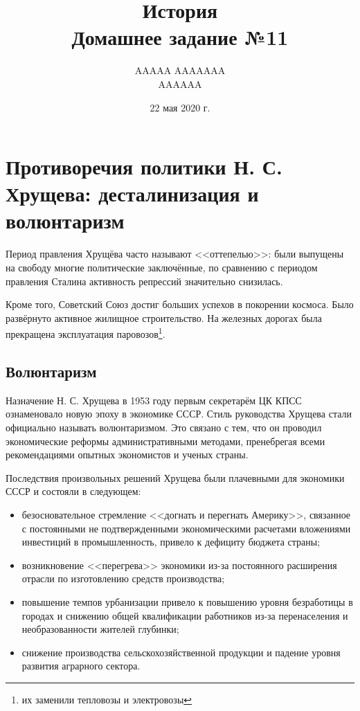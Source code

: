\documentclass[12pt]{article}
\title{История \\ Домашнее задание №11}
\author{AAAAA AAAAAAA \\ AAAAAA}
\date{22 мая 2020 г.}
\begin{document}
  \maketitle

  \section{Противоречия политики Н. С. Хрущева: десталинизация и волюнтаризм}
  Период правления Хрущёва часто называют <<оттепелью>>: были выпущены на свободу многие политические заключённые,
  по сравнению с периодом правления Сталина активность репрессий значительно снизилась.

  Кроме того, Советский Союз достиг больших успехов в покорении космоса.
  Было развёрнуто активное жилищное строительство.
  На железных дорогах была прекращена эксплуатация паровозов\footnote{их заменили тепловозы и электровозы}.

  \subsection{Волюнтаризм}
  Назначение Н. С. Хрущева в 1953 году первым секретарём ЦК КПСС ознаменовало новую эпоху в экономике СССР.
  Стиль руководства Хрущева стали официально называть волюнтаризмом.
  Это связано с тем, что он проводил экономические реформы административными методами,
  пренебрегая всеми рекомендациями опытных экономистов и ученых страны.

  Последствия произвольных решений Хрущева были плачевными для экономики СССР и состояли в следующем:
  \begin{itemize}
    \item безосновательное стремление <<догнать и перегнать Америку>>, связанное с постоянными не подтвержденными экономическими расчетами вложениями инвестиций в промышленность, привело к дефициту бюджета страны;
    \item возникновение <<перегрева>> экономики из-за постоянного расширения отрасли по изготовлению средств производства;
    \item повышение темпов урбанизации привело к повышению уровня безработицы в городах и снижению общей квалификации работников из-за перенаселения и необразованности жителей глубинки;
    \item снижение производства сельскохозяйственной продукции и падение уровня развития аграрного сектора.
  \end{itemize}
\end{document}
